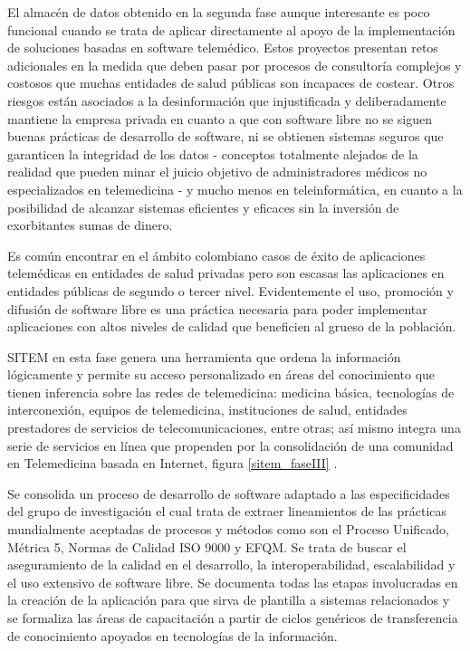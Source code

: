 El almacén de datos obtenido en la segunda fase aunque interesante es poco funcional cuando se trata de aplicar directamente al apoyo de la implementación de soluciones basadas en software telemédico. Estos proyectos presentan retos adicionales en la medida que deben pasar por procesos de consultoría complejos y costosos que muchas entidades de salud públicas son incapaces de costear. Otros riesgos están asociados a la desinformación que injustificada y deliberadamente mantiene la empresa privada en cuanto a que con software libre no se siguen buenas prácticas de desarrollo de software, ni se obtienen sistemas seguros que garanticen la integridad de los datos - conceptos totalmente alejados de la realidad que pueden minar el juicio objetivo de administradores médicos no especializados en telemedicina - y mucho menos en teleinformática, en cuanto a la posibilidad de alcanzar sistemas eficientes y eficaces sin la inversión de exorbitantes sumas de dinero. 

Es común encontrar en el ámbito colombiano casos de éxito de aplicaciones telemédicas en entidades de salud privadas pero son escasas las aplicaciones en entidades públicas de segundo o tercer nivel. Evidentemente el uso, promoción y difusión de software libre es una práctica necesaria para poder implementar aplicaciones con altos niveles de calidad que beneficien al grueso de la población.

SITEM en esta fase genera una herramienta que ordena la información lógicamente y permite su acceso personalizado en áreas del conocimiento que tienen inferencia sobre las redes de telemedicina: medicina básica, tecnologías de interconexión, equipos de telemedicina, instituciones de salud, entidades prestadores de servicios de telecomunicaciones, entre otras; así mismo integra una serie de servicios en línea que propenden por la consolidación de una comunidad en Telemedicina basada en Internet, figura \ref{sitem_faseIII} .

Se consolida un proceso de desarrollo de software adaptado a las especificidades del grupo de investigación el cual trata de extraer lineamientos de las prácticas mundialmente aceptadas de procesos y métodos como son el Proceso Unificado, Métrica 5, Normas de Calidad ISO 9000 y EFQM. Se trata de buscar el aseguramiento de la calidad en el desarrollo, la interoperabilidad, escalabilidad y el uso extensivo de software libre. Se documenta todas las etapas involucradas en la creación de la aplicación para que sirva de plantilla a sistemas relacionados y se formaliza las áreas de capacitación a partir de ciclos genéricos de transferencia de conocimiento apoyados en tecnologías de la información.

